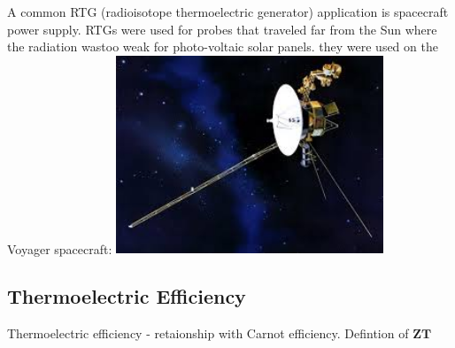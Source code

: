 \documentclass[twocolumn]{article}
\begin{document}
A common RTG (radioisotope thermoelectric generator) application is spacecraft power supply. RTGs were used for probes that traveled far from the Sun where the radiation wastoo weak for photo-voltaic solar panels. they were used on the Voyager spacecraft: \includegraphics[width=80mm]{voyager.jpg}

\subsection{Thermoelectric Efficiency}
\label{sec:Thermoelectric Efficiency}
Thermoelectric efficiency - retaionship with Carnot efficiency. Defintion of $\mathbf{ZT}$
\end{document}
